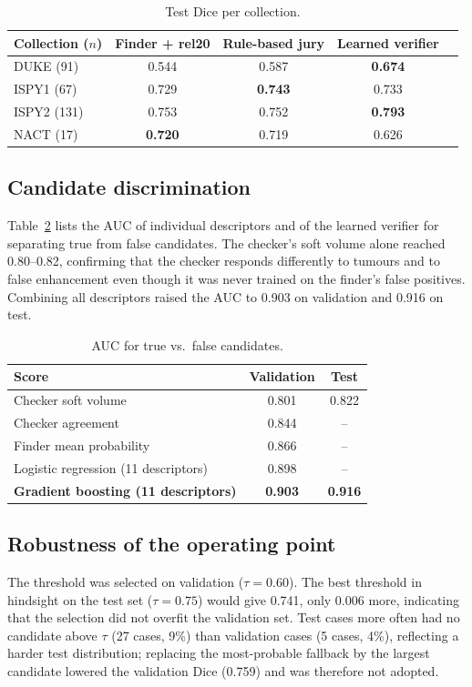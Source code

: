 \documentclass[journal]{IEEEtran}
\begin{document}
\begin{table}[t]
\centering
\caption{Test Dice per collection.}
\label{tab:coll}
\setlength{\tabcolsep}{3pt}
\begin{tabular}{lcccc}
\toprule
Collection ($n$) & Finder + rel20 & Rule-based jury & Learned verifier \\
\midrule
DUKE (91) & 0.544 & 0.587 & \textbf{0.674} \\
ISPY1 (67) & 0.729 & \textbf{0.743} & 0.733 \\
ISPY2 (131) & 0.753 & 0.752 & \textbf{0.793} \\
NACT (17) & \textbf{0.720} & 0.719 & 0.626 \\
\bottomrule
\end{tabular}
\end{table}

\subsection{Candidate discrimination}
Table~\ref{tab:auc} lists the AUC of individual descriptors and of the learned verifier for separating true from false candidates. The checker's soft volume alone reached 0.80--0.82, confirming that the checker responds differently to tumours and to false enhancement even though it was never trained on the finder's false positives. Combining all descriptors raised the AUC to 0.903 on validation and 0.916 on test.

\begin{table}[t]
\centering
\caption{AUC for true vs.\ false candidates.}
\label{tab:auc}
\setlength{\tabcolsep}{5pt}
\begin{tabular}{lcc}
\toprule
Score & Validation & Test \\
\midrule
Checker soft volume & 0.801 & 0.822 \\
Checker agreement & 0.844 & -- \\
Finder mean probability & 0.866 & -- \\
Logistic regression (11 descriptors) & 0.898 & -- \\
\textbf{Gradient boosting (11 descriptors)} & \textbf{0.903} & \textbf{0.916} \\
\bottomrule
\end{tabular}
\end{table}

\subsection{Robustness of the operating point}
The threshold was selected on validation ($\tau=0.60$). The best threshold in hindsight on the test set ($\tau=0.75$) would give 0.741, only 0.006 more, indicating that the selection did not overfit the validation set. Test cases more often had no candidate above $\tau$ (27 cases, 9\%) than validation cases (5 cases, 4\%), reflecting a harder test distribution; replacing the most-probable fallback by the largest candidate lowered the validation Dice (0.759) and was therefore not adopted.
\end{document}
